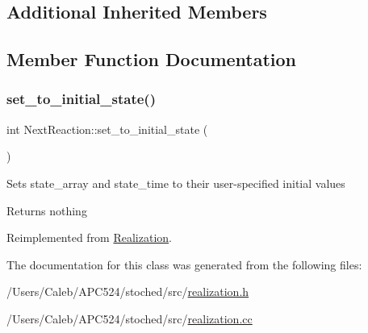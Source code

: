 \subsection*{Additional Inherited Members}


\subsection{Member Function Documentation}
\mbox{\label{class_next_reaction_a0cc63c4ec9fe3f338472fff302f6d746}} 
\subsubsection{\texorpdfstring{set\+\_\+to\+\_\+initial\+\_\+state()}{set\_to\_initial\_state()}}
{\footnotesize\ttfamily int Next\+Reaction\+::set\+\_\+to\+\_\+initial\+\_\+state (\begin{DoxyParamCaption}{ }\end{DoxyParamCaption})\hspace{0.3cm}{\ttfamily [virtual]}}

Sets state\+\_\+array and state\+\_\+time to their user-\/specified initial values

\begin{DoxyReturn}{Returns}
nothing 
\end{DoxyReturn}


Reimplemented from \hyperlink{class_realization_a391a89af7574a9053f53f8a299c2cc70}{Realization}.



The documentation for this class was generated from the following files\+:\begin{DoxyCompactItemize}
\item 
/\+Users/\+Caleb/\+A\+P\+C524/stoched/src/\hyperlink{realization_8h}{realization.\+h}\item 
/\+Users/\+Caleb/\+A\+P\+C524/stoched/src/\hyperlink{realization_8cc}{realization.\+cc}\end{DoxyCompactItemize}
